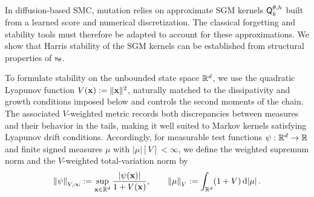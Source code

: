 \documentclass[11pt]{article}
\theoremstyle{plain}
\theoremstyle{definition}
\newtheorem{assumption}[theorem]{Assumption}
\theoremstyle{remark}
\begin{document}
In diffusion-based SMC, mutation relies on approximate SGM kernels $\mk{k}[\theta,h]$ built from a learned score and numerical discretization. The classical forgetting and stability tools must therefore be adapted to account for these approximations. We show that Harris stability of the SGM kernels can be established from structural properties of  $\scorenet$.

To formulate stability on the unbounded state space $\mathbb{R}^d$, we use the quadratic Lyapunov function $V(\mathbf{x}):=\|\mathbf{x}\|^2$, naturally matched to the dissipativity and growth conditions imposed below and controls the second moments of the chain. The associated $V$-weighted metric records both discrepancies between measures and their behavior in the tails, making it well suited to Markov kernels satisfying Lyapunov drift conditions. Accordingly, for measurable test functions $\psi:\mathbb{R}^d\to\mathbb{R}$ and finite signed measures $\mu$ with $|\mu|[V]<\infty$, we define the weighted supremum norm and the $V$-weighted total-variation norm by
\begin{equation}
\label{eq:weighted_norms_main}
    \normEc{\psi}_{V,\infty}
    \eqdef
    \sup_{\x\in\rset^\xdim}
    \frac{|\psi(\x)|}{1+V(\x)},
    \qquad
    \vnorm[\mu][V]
    \eqdef
    \int_{\rset^\xdim}(1+V)\,\rmd|\mu| \eqsp.
\end{equation}


\end{document}
